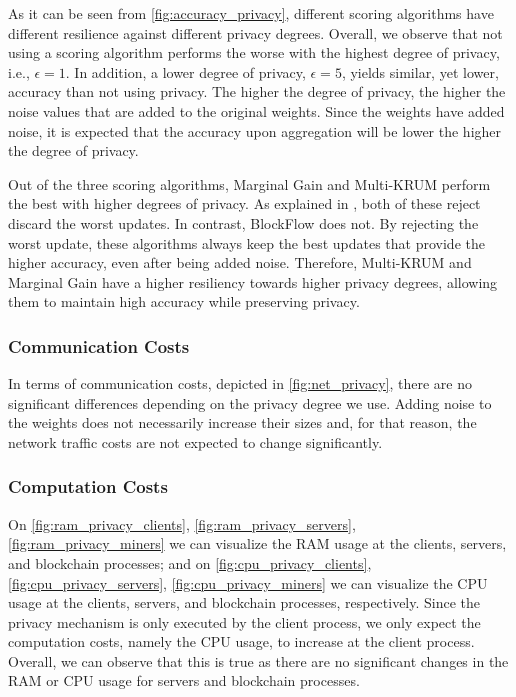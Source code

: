 As it can be seen from \autoref{fig:accuracy_privacy}, different scoring algorithms have different resilience against different privacy degrees. Overall, we observe that not using a scoring algorithm performs the worse with the highest degree of privacy, i.e., $\epsilon = 1$. In addition, a lower degree of privacy, $\epsilon = 5$, yields similar, yet lower, accuracy than not using privacy. The higher the degree of privacy, the higher the noise values that are added to the original weights. Since the weights have added noise, it is expected that the accuracy upon aggregation will be lower the higher the degree of privacy.

Out of the three scoring algorithms, Marginal Gain and Multi-KRUM perform the best with higher degrees of privacy. As explained in , both of these reject discard the worst updates. In contrast, BlockFlow does not. By rejecting the worst update, these algorithms always keep the best updates that provide the higher accuracy, even after being added noise. Therefore, Multi-KRUM and Marginal Gain have a higher resiliency towards higher privacy degrees, allowing them to maintain high accuracy while preserving privacy.

\subsubsection{Communication Costs}

In terms of communication costs, depicted in \autoref{fig:net_privacy}, there are no significant differences depending on the privacy degree we use. Adding noise to the weights does not necessarily increase their sizes and, for that reason, the network traffic costs are not expected to change significantly.

\subsubsection{Computation Costs}

On \autoref{fig:ram_privacy_clients}, \autoref{fig:ram_privacy_servers}, \autoref{fig:ram_privacy_miners} we can visualize the RAM usage at the clients, servers, and blockchain processes; and on \autoref{fig:cpu_privacy_clients}, \autoref{fig:cpu_privacy_servers}, \autoref{fig:cpu_privacy_miners} we can visualize the CPU usage at the clients, servers, and blockchain processes, respectively. Since the privacy mechanism is only executed by the client process, we only expect the computation costs, namely the CPU usage, to increase at the client process. Overall, we can observe that this is true as there are no significant changes in the RAM or CPU usage for servers and blockchain processes.

